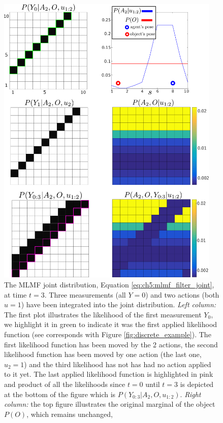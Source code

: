 \begin{figure}
 \centering
 \includegraphics[width=0.95\textwidth]{./ch5-MLMF/Figures/explenation/example_marginal.pdf}
 \caption{The MLMF joint distribution, Equation \ref{eq:ch5:mlmf_filter_joint}, at time $t=3$.
 Three measurements (all $Y=0$) and two actions (both $u=1$) have been integrated into the joint distribution. \textit{Left column:} The first plot
 illustrates the likelihood of the first measurement $Y_0$, we highlight it in green to indicate it was the first applied likelihood 
 function (see corresponds with Figure \ref{fig:discrete_example}). The first likelihood function has been moved by the 2 actions, the 
 second likelihood function has been moved by one action (the last one, $u_2=1$) and the third likelihood has not has had no action applied to it 
 yet. The last applied likelihood function is highlighted in pink and product of all the likelihoods since $t=0$ until $t=3$ is depicted at the 
 bottom of the figure which is $P(Y_{0:3}|A_2,O,u_{1:2})$. \textit{Right column:} the top figure illustrates the original marginal of the object $P(O)$, which remains unchanged, 
}
\end{figure}
